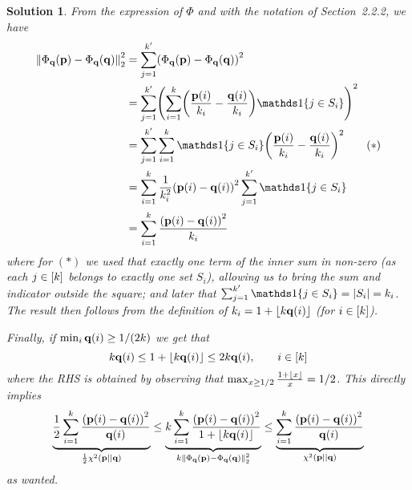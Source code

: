 \documentclass[biber,plain]{nowfnt} %
\newtheorem{solution}{Solution}[chapter]
\begin{document}
\begin{solution}
From the expression of $\Phi$ and with the notation of Section~2.2.2, we have
\begin{align*}
	\normtwo{\Phi_\q(\p)-\Phi_\q(\q)}^2
	&= \sum_{j=1}^{\ab'} \Paren{\Phi_\q(\p)-\Phi_\q(\q)}^2 \\
	&= \sum_{j=1}^{\ab'} \Paren{\sum_{i=1}^\ab \Paren{\frac{\p(i)}{\ab_i} - \frac{\q(i)}{\ab_i}} \indic{j\in S_i} }^2\\
	&= \sum_{j=1}^{\ab'} \sum_{i=1}^\ab \indic{j\in S_i}  \Paren{\frac{\p(i)}{\ab_i} - \frac{\q(i)}{\ab_i}}^2 \tag{$\ast$}\\
	&= \sum_{i=1}^\ab \frac{1}{\ab_i^2} \Paren{\p(i)-\q(i)}^2 \sum_{j=1}^{\ab'}\indic{j\in S_i}  \\
	&= \sum_{i=1}^\ab \frac{\Paren{\p(i)-\q(i)}^2}{\ab_i}  \\
\end{align*}
where for $(\ast)$ we used that exactly one term of the inner sum in non-zero (as each $j\in[k]$ belongs to exactly one  set $S_i$), allowing us to bring the sum and indicator outside the square; and later that $\sum_{j=1}^{\ab'}\indic{j\in S_i} = \abs{S_i} = \ab_i$. The result then follows from the definition of $\ab_i=1+\flr{\ab\q(i)}$ (for $i\in[k]$).

\noindent Finally, if $\min_i \mathbf{q}(i) \geq 1/(2k)$ we get that
\[
	\ab\q(i) \leq 1+\flr{\ab\q(i)} \leq 2\ab\q(i), \qquad i\in[\ab]
\]
where the RHS is obtained by observing that $\max_{x\geq 1/2} \frac{1+\flr{x}}{x} = 1/2$. This directly implies
\[
		\underbrace{\frac{1}{2}\sum_{i=1}^\ab \frac{\Paren{\p(i)-\q(i)}^2}{\q(i)}}_{\frac{1}{2}\chisquare{\p}{\q}} \leq \underbrace{\ab \sum_{i=1}^\ab \frac{\Paren{\p(i)-\q(i)}^2}{1+\flr{\ab\q(i)}}}_{\ab\normtwo{\Phi_\q(\p)-\Phi_\q(\q)}^2} 
		\leq \underbrace{\sum_{i=1}^\ab \frac{\Paren{\p(i)-\q(i)}^2}{\q(i)}}_{\chisquare{\p}{\q}}
\]
as wanted.
\end{solution}
\end{document}
